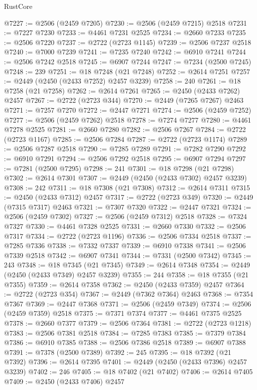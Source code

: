 \begin{lexlean}{RustCore}
\begin{coremodule}
@7227 := @2506 (@2459 @7205)
@7230 := @2506 (@2459 @7215) @2518
@7231 := @7227 @7230
@7233 := @4461 @7231 @2525
@7234 := @2660 @7233
@7235 := @2506 @7220
@7237 := @2722 (@2723 @1145)
@7239 := @2506 @7237 @2518
@7240 := @7000 @7239
@7241 := @7235 @7240
@7242 := @6910 @7241
@7244 := @2506 @7242 @2518
@7245 := @6907 @7244
@7247 := @7234 (@2500 @7245)
@7248 := 239
@7251 := @18 @7248 (@21 @7248)
@7252 := @2614 @7251
@7257 := @2449 (@2450 (@2433 @7252) @2457 @3239)
@7258 := 240
@7261 := @18 @7258 (@21 @7258)
@7262 := @2614 @7261
@7265 := @2450 (@2433 @7262) @2457
@7267 := @2722 (@2723 @344)
@7270 := @2449 (@7265 @7267) @2463
@7271 := @7257 @7270
@7272 := @2447 @7271
@7274 := @2506 (@2459 @7252)
@7277 := @2506 (@2459 @7262) @2518
@7278 := @7274 @7277
@7280 := @4461 @7278 @2525
@7281 := @2660 @7280
@7282 := @2506 @7267
@7284 := @2722 (@2723 @1167)
@7285 := @2506 @7284
@7287 := @2722 (@2723 @1174)
@7289 := @2506 @7287 @2518
@7290 := @7285 @7289
@7291 := @7282 @7290
@7292 := @6910 @7291
@7294 := @2506 @7292 @2518
@7295 := @6907 @7294
@7297 := @7281 (@2500 @7295)
@7298 := 241
@7301 := @18 @7298 (@21 @7298)
@7302 := @2614 @7301
@7307 := @2449 (@2450 (@2433 @7302) @2457 @3239)
@7308 := 242
@7311 := @18 @7308 (@21 @7308)
@7312 := @2614 @7311
@7315 := @2450 (@2433 @7312) @2457
@7317 := @2722 (@2723 @349)
@7320 := @2449 (@7315 @7317) @2463
@7321 := @7307 @7320
@7322 := @2447 @7321
@7324 := @2506 (@2459 @7302)
@7327 := @2506 (@2459 @7312) @2518
@7328 := @7324 @7327
@7330 := @4461 @7328 @2525
@7331 := @2660 @7330
@7332 := @2506 @7317
@7334 := @2722 (@2723 @1196)
@7336 := @2506 @7334 @2518
@7337 := @7285 @7336
@7338 := @7332 @7337
@7339 := @6910 @7338
@7341 := @2506 @7339 @2518
@7342 := @6907 @7341
@7344 := @7331 (@2500 @7342)
@7345 := 243
@7348 := @18 @7345 (@21 @7345)
@7349 := @2614 @7348
@7354 := @2449 (@2450 (@2433 @7349) @2457 @3239)
@7355 := 244
@7358 := @18 @7355 (@21 @7355)
@7359 := @2614 @7358
@7362 := @2450 (@2433 @7359) @2457
@7364 := @2722 (@2723 @354)
@7367 := @2449 (@7362 @7364) @2463
@7368 := @7354 @7367
@7369 := @2447 @7368
@7371 := @2506 (@2459 @7349)
@7374 := @2506 (@2459 @7359) @2518
@7375 := @7371 @7374
@7377 := @4461 @7375 @2525
@7378 := @2660 @7377
@7379 := @2506 @7364
@7381 := @2722 (@2723 @1218)
@7383 := @2506 @7381 @2518
@7384 := @7285 @7383
@7385 := @7379 @7384
@7386 := @6910 @7385
@7388 := @2506 @7386 @2518
@7389 := @6907 @7388
@7391 := @7378 (@2500 @7389)
@7392 := 245
@7395 := @18 @7392 (@21 @7392)
@7396 := @2614 @7395
@7401 := @2449 (@2450 (@2433 @7396) @2457 @3239)
@7402 := 246
@7405 := @18 @7402 (@21 @7402)
@7406 := @2614 @7405
@7409 := @2450 (@2433 @7406) @2457

\end{coremodule}
\end{lexlean}
